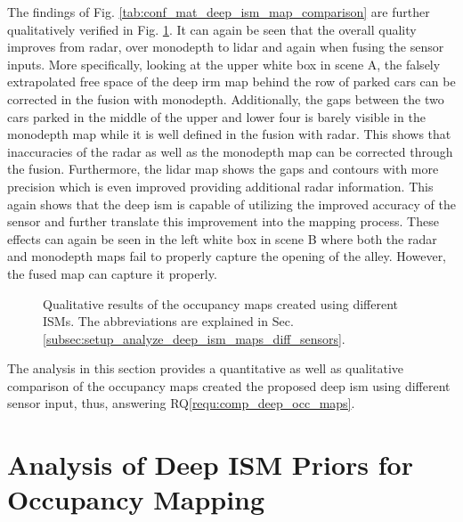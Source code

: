 The findings of Fig. \ref{tab:conf_mat_deep_ism_map_comparison} are further qualitatively verified in Fig. \ref{fig:comparison_of_maps_diff_sens}. It can again be seen that the overall quality improves from radar, over \gls{monodepth} to lidar and again when fusing the sensor inputs. More specifically, looking at the upper white box in scene A, the falsely extrapolated free space of the deep \gls{irm} map behind the row of parked cars can be corrected in the fusion with \gls{monodepth}. Additionally, the gaps between the two cars parked in the middle of the upper and lower four is barely visible in the \gls{monodepth} map while it is well defined in the fusion with radar. This shows that inaccuracies of the radar as well as the \gls{monodepth} map can be corrected through the fusion. Furthermore, the lidar map shows the gaps and contours with more precision which is even improved providing additional radar information. This again shows that the deep \gls{ism} is capable of utilizing the improved accuracy of the sensor and further translate this improvement into the mapping process. These effects can again be seen in the left white box in scene B where both the radar and \gls{monodepth} maps fail to properly capture the opening of the alley. However, the fused map can capture it properly.
\begin{figure}[H]
	\begin{center}
		\caption{\label{fig:comparison_of_maps_diff_sens}Qualitative results of the occupancy maps created using different ISMs. The abbreviations are explained in Sec. \ref{subsec:setup_analyze_deep_ism_maps_diff_sensors}.}
	\end{center}
\end{figure}
The analysis in this section provides a quantitative as well as qualitative comparison of the occupancy maps created the proposed deep \gls{ism} using different sensor input, thus, answering RQ\ref{requ:comp_deep_occ_maps}.
%
\section{Analysis of Deep ISM Priors for Occupancy Mapping}
\label{sec:exp_analyze_prior_properties}
%
